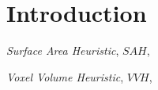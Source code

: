 \chapter{Introduction}












\textit{Surface Area Heuristic}, $SAH$, 

\textit{Voxel Volume Heuristic}, $VVH$,


